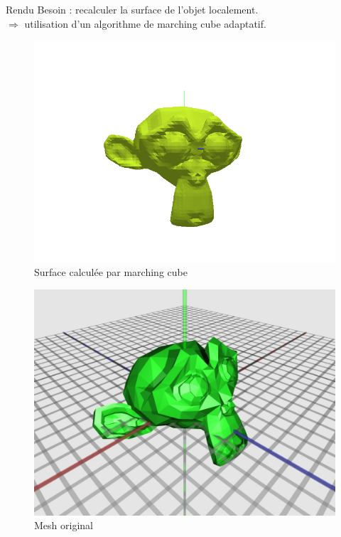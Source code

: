 \documentclass{beamer}
\begin{document}
\begin{frame}{Rendu}
  Besoin : recalculer la surface de l'objet localement.\\
  $\Rightarrow$ utilisation d'un algorithme de marching cube
  adaptatif.\\
  \begin{minipage}{0.48\linewidth} 
    \begin{figure}[!h]
      \centering\includegraphics[scale=0.2]{FilledFace.png}
      \caption{Surface calculée par marching cube}
      \label{FilledFace}
    \end{figure}
  \end{minipage}
  \begin{minipage}{0.48\linewidth}
    \begin{figure}[!h]
      \centering\includegraphics[scale=0.15]{Monkey.jpg}
      \caption{Mesh original}
      \label{LineFace}
    \end{figure}
  \end{minipage}
\end{frame}
\end{document}

